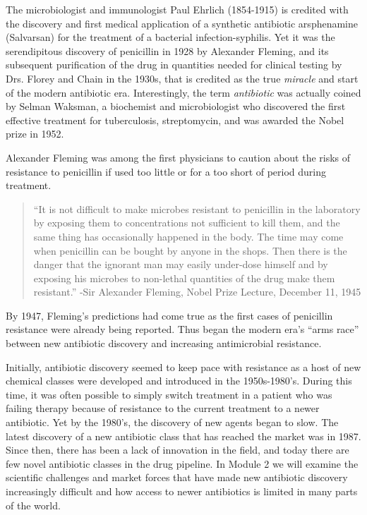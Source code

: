 \documentclass[
]{book}
\begin{document}
The microbiologist and immunologist Paul Ehrlich (1854-1915) is credited with the discovery and first medical application of a synthetic antibiotic arsphenamine (Salvarsan) for the treatment of a bacterial infection-syphilis. Yet it was the serendipitous discovery of penicillin in 1928 by Alexander Fleming, and its subsequent purification of the drug in quantities needed for clinical testing by Drs. Florey and Chain in the 1930s, that is credited as the true \emph{miracle} and start of the modern antibiotic era. Interestingly, the term \emph{antibiotic} was actually coined by Selman Waksman, a biochemist and microbiologist who discovered the first effective treatment for tuberculosis, streptomycin, and was awarded the Nobel prize in 1952.

Alexander Fleming was among the first physicians to caution about the risks of resistance to penicillin if used too little or for a too short of period during treatment.

\begin{quote}
``It is not difficult to make microbes resistant to penicillin in the laboratory by exposing them to concentrations not sufficient to kill them, and the same thing has occasionally happened in the body. The time may come when penicillin can be bought by anyone in the shops. Then there is the danger that the ignorant man may easily under-dose himself and by exposing his microbes to non-lethal quantities of the drug make them resistant.'' -Sir Alexander Fleming, Nobel Prize Lecture, December 11, 1945
\end{quote}

By 1947, Fleming's predictions had come true as the first cases of penicillin resistance were already being reported. Thus began the modern era's ``arms race'' between new antibiotic discovery and increasing antimicrobial resistance.

Initially, antibiotic discovery seemed to keep pace with resistance as a host of new chemical classes were developed and introduced in the 1950s-1980's. During this time, it was often possible to simply switch treatment in a patient who was failing therapy because of resistance to the current treatment to a newer antibiotic. Yet by the 1980's, the discovery of new agents began to slow. The latest discovery of a new antibiotic class that has reached the market was in 1987. Since then, there has been a lack of innovation in the field, and today there are few novel antibiotic classes in the drug pipeline. In Module 2 we will examine the scientific challenges and market forces that have made new antibiotic discovery increasingly difficult and how access to newer antibiotics is limited in many parts of the world.
\end{document}
